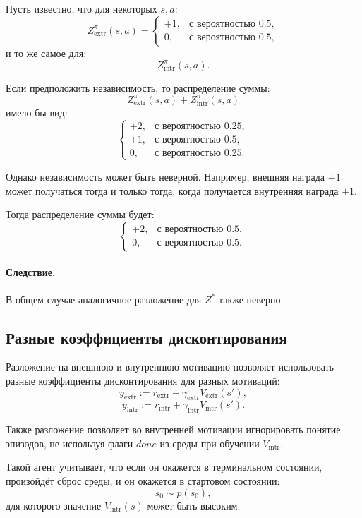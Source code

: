 \documentclass[12pt,a4paper]{article}
\begin{document}
Пусть известно, что для некоторых $s,a$:
\[
Z^\pi_{\mathrm{extr}}(s,a)
=
\begin{cases}
+1, & \text{с вероятностью }0.5,\\
0, & \text{с вероятностью }0.5,
\end{cases}
\]
и то же самое для:
\[
Z^\pi_{\mathrm{intr}}(s,a).
\]

Если предположить независимость, то распределение суммы:
\[
Z^\pi_{\mathrm{extr}}(s,a)
+
Z^\pi_{\mathrm{intr}}(s,a)
\]
имело бы вид:
\[
\begin{cases}
+2, & \text{с вероятностью }0.25,\\
+1, & \text{с вероятностью }0.5,\\
0, & \text{с вероятностью }0.25.
\end{cases}
\]

Однако независимость может быть неверной. Например, внешняя награда $+1$ может получаться тогда и только тогда, когда получается внутренняя награда $+1$.

Тогда распределение суммы будет:
\[
\begin{cases}
+2, & \text{с вероятностью }0.5,\\
0, & \text{с вероятностью }0.5.
\end{cases}
\]

\paragraph{Следствие.}

В общем случае аналогичное разложение для $Z^\ast$ также неверно.

\subsection{Разные коэффициенты дисконтирования}

Разложение на внешнюю и внутреннюю мотивацию позволяет использовать разные коэффициенты дисконтирования для разных мотиваций:
\[
y_{\mathrm{extr}}
:=
r_{\mathrm{extr}}
+
\gamma_{\mathrm{extr}}V_{\mathrm{extr}}(s'),
\]
\[
y_{\mathrm{intr}}
:=
r_{\mathrm{intr}}
+
\gamma_{\mathrm{intr}}V_{\mathrm{intr}}(s').
\]

Также разложение позволяет во внутренней мотивации игнорировать понятие эпизодов, не используя флаги $done$ из среды при обучении $V_{\mathrm{intr}}$.

Такой агент учитывает, что если он окажется в терминальном состоянии, произойдёт сброс среды, и он окажется в стартовом состоянии:
\[
s_0 \sim p(s_0),
\]
для которого значение $V_{\mathrm{intr}}(s)$ может быть высоким.
\end{document}
